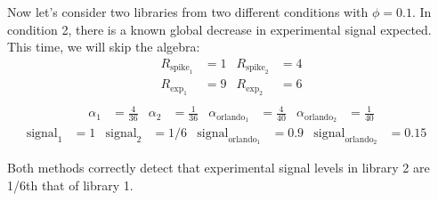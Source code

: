 Now let's consider two libraries from two different conditions with $\phi=0.1$.
In condition 2, there is a known global decrease in experimental signal expected.
This time, we will skip the algebra:
\begin{align*}
    R_{\text{spike}_1} &= 1 & R_{\text{spike}_2} &= 4 \\
    R_{\text{exp}_1} &= 9 & R_{\text{exp}_2} &= 6 \\
\end{align*}
\begin{align*}
    \alpha_1 &= \frac{4}{36} &
    \alpha_2 &= \frac{1}{36} &
    \alpha_{\text{orlando}_1} &= \frac{4}{40} &
    \alpha_{\text{orlando}_2} &= \frac{1}{40}
\end{align*}
\begin{align*}
    \text{signal}_1 &=  1 &
    \text{signal}_2 &=  1/6 &
    \text{signal}_{\text{orlando}_1} &= 0.9 &
    \text{signal}_{\text{orlando}_2} &= 0.15 &
\end{align*}

Both methods correctly detect that experimental signal levels in library 2 are 1/6th that of library 1.

